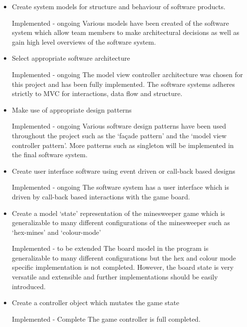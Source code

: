 \documentclass[12pt, a4]{report}
\begin{document}
\begin{itemize}
	\item Create system models for structure and behaviour of software products.
	\par \textcolor{codegreen}{Implemented - ongoing \textbar{} } Various models have been created of the software system which allow team members to make architectural decisions as well as gain high level overviews of the software system.
	
	\item Select appropriate software architecture
	\par \textcolor{codegreen}{Implemented - ongoing \textbar{} } The model view controller architecture was chosen for this project and has been fully implemented. The software systems adheres strictly to MVC for interactions, data flow and structure. 

	\item Make use of appropriate design patterns
	\par \textcolor{codegreen}{Implemented - ongoing \textbar{} } Various software design patterns have been used throughout the project such as the `façade pattern' and the `model view controller pattern'. More patterns such as singleton will be implemented in the final software system.

	\item Create user interface software using event driven or call-back based designs
	\par \textcolor{codegreen}{Implemented - ongoing \textbar{} } The software system has a user interface which is driven by call-back based interactions with the game board.

	\item Create a model `state' representation of the minesweeper game which is generalizable to many different configurations of the minesweeper such as `hex-mines' and `colour-mode'
	\par \textcolor{fawn}{Implemented - to be extended \textbar{} } The board model in the program is generalizable to many different configurations but the hex and colour mode specific implementation is not completed. However, the board state is very versatile and extensible and further implementations should be easily introduced.

	\item Create a controller object which mutates the game state
	\par \textcolor{codegreen}{Implemented - Complete \textbar{} } The game controller is full completed.


\end{itemize}
\end{document}
